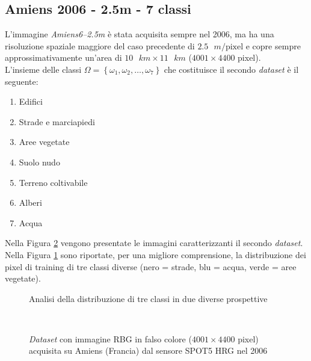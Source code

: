 \clearpage
\subsection{Amiens 2006 - 2.5m - 7 classi}
L'immagine \emph{Amiens6--2.5m} è stata acquisita sempre nel 2006, ma ha una risoluzione  spaziale maggiore del caso precedente di $2.5\text{ }m/\text{pixel}$  e copre sempre approssimativamente un'area di $10\text{ }km\times11\text{ }km$ ($4001\times4400$ pixel).\\
L'insieme delle classi $\Omega=\left\lbrace\omega_1,\omega_2,\ldots,\omega_{7}\right\rbrace$ che costituisce il secondo \emph{dataset} è il seguente:
\begin{enumerate}
\item Edifici
\item Strade e marciapiedi
\item Aree vegetate
\item Suolo nudo
\item Terreno coltivabile
\item Alberi
\item Acqua
\end{enumerate}
Nella Figura \ref{fig: Amiens62_5m} vengono presentate le immagini caratterizzanti il secondo \emph{dataset}. Nella Figura \ref{fig:3classi} sono riportate, per una migliore comprensione, la distribuzione dei pixel di training di tre classi diverse (nero = strade, blu = acqua, verde = aree vegetate).

 \begin{figure}[!ht]
\center  
{}
      \hspace{3mm}
		
    \caption{Analisi della distribuzione di tre classi in due diverse prospettive}
    \label{fig:3classi}
  \end{figure}


\clearpage

\begin{figure}[!ht]
   \center
   \\%
     \hspace{4mm}
    \caption{\emph{Dataset} con immagine RBG in falso colore ($4001\times4400$ pixel) acquisita su Amiens (Francia) dal sensore \textsc{SPOT5 HRG} nel 2006}
    \label{fig: Amiens62_5m}
  \end{figure}
\clearpage


